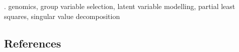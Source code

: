 \documentclass[12pt]{article}
\begin{document}
\vskip 2mm

.
genomics, group variable selection, latent variable modelling, partial least squares, singular value decomposition


%        
%
%        

\subsection*{References}
\end{document}
